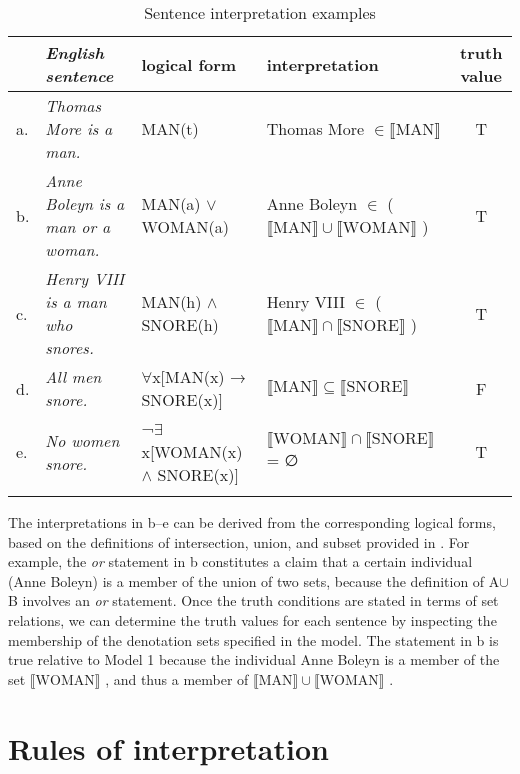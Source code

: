 \begin{table}
\scriptsize
\caption{Sentence interpretation examples}
\label{extab:13.21} 
\begin{tabularx}{\textwidth}{l@{~} >{\itshape}Q@{}l@{~}l@{}c}
\lsptoprule
 & \textup{English sentence} &  logical form &  interpretation &  truth value\\
\midrule
a. &  Thomas More is a man. &  MAN(t) & Thomas More ${\in} \llbracket\text{MAN}\rrbracket$  &   T \\
\tablevspace
b. &  Anne Boleyn is a man or a woman. &  MAN(a) $\vee$ WOMAN(a)  &  Anne Boleyn ${\in}$ ($\llbracket\text{MAN}\rrbracket {\cup} \llbracket\text{WOMAN}\rrbracket$ ) & T\\
\tablevspace
c. &   {Henry VIII is a man who snores}. & MAN(h) $\wedge$ SNORE(h) & Henry VIII ${\in}$ ($\llbracket\text{MAN}\rrbracket {\cap} \llbracket\text{SNORE}\rrbracket$ ) & T\\
\tablevspace
d. & {All men snore}.& ${\forall}$x[MAN(x) → SNORE(x)] & $\llbracket\text{MAN}\rrbracket {\subseteq} \llbracket\text{SNORE}\rrbracket$  & F\\
\tablevspace
e. &   {No women snore.} &  ¬${\exists}$x[WOMAN(x) $\wedge$ SNORE(x)] & $\llbracket\text{WOMAN}\rrbracket {\cap} \llbracket\text{SNORE}\rrbracket$  = ∅ & T\\
\lspbottomrule
\end{tabularx} 
\end{table}

The interpretations in b--e can be derived from the corresponding logical forms, based on the definitions of intersection, union, and subset provided in . For example, the \textit{or} statement in b constitutes a claim that a certain individual (Anne Boleyn) is a member of the union of two sets, because the definition of A${\cup}$B involves an \textit{or} statement. Once the truth conditions are stated in terms of set relations, we can determine the truth values for each sentence by inspecting the membership of the denotation sets specified in the model. The statement in b is true relative to Model 1 because the individual Anne Boleyn is a member of the set $\llbracket\text{WOMAN}\rrbracket$ , and thus a member of $\llbracket\text{MAN}\rrbracket {\cup} \llbracket\text{WOMAN}\rrbracket$ .


\section{Rules of interpretation}\label{sec:13.5}

